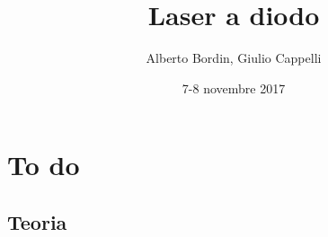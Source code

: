 \documentclass[a4paper]{article}
\author{Alberto Bordin, Giulio Cappelli}
\title{Laser a diodo}
\date{7-8 novembre 2017}
\begin{document}
	\maketitle
	
\begin{abstract}
	
\end{abstract}

\section{To do}

\begin{multicols}{2}

\section{Teoria}

\end{multicols}
\end{document}
